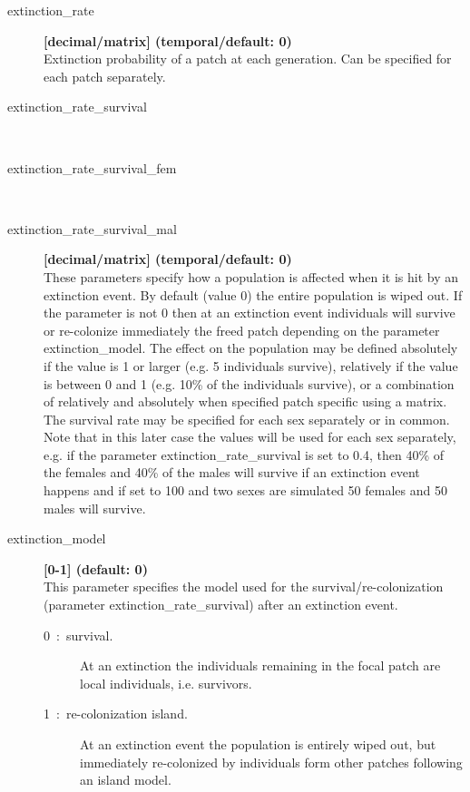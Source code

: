\documentclass[letterpaper,12pt,oneside]{book}
\begin{document}
\begin{description}
\item[extinction\_rate] \textbf{[decimal/matrix] (temporal/default: 0)}\\
Extinction probability of a patch at each generation. Can be specified for each patch separately.

\item[extinction\_rate\_survival]\hspace*{\fill}\\
\vspace{-9mm}
\item[extinction\_rate\_survival\_fem]\hspace*{\fill}\\
\vspace{-9mm}
\item[extinction\_rate\_survival\_mal] \textbf{[decimal/matrix] (temporal/default: 0)}\\
These parameters specify how a population is affected when it is hit by an extinction event. By default (value 0) the entire population is wiped out. If the parameter is not 0 then at an extinction event individuals will survive or re-colonize immediately the freed patch depending on the parameter \textsf{extinction\_model}. The effect on the population may be defined absolutely if the value is 1 or larger (e.g. 5 individuals survive), relatively if the value is between 0 and 1 (e.g. 10\% of the individuals survive), or a combination of relatively and absolutely when specified patch specific  using a matrix. The survival rate may be specified for each sex separately or in common. Note that in this later case the values will be used for each sex separately, e.g. if the parameter \textsf{extinction\_rate\_survival} is set to 0.4, then 40\% of the females and 40\% of the males will survive if an extinction event happens and if set to 100 and two sexes are simulated 50 females and 50 males will survive.

\item[extinction\_model] \textbf{[0-1] (default: 0)}  \\
This parameter specifies the model used for the survival/re-colonization (parameter \textsf{extinction\_rate\_survival}) after an extinction event.
\begin{description}
\item[0~:~survival.] At an extinction the individuals remaining in the focal patch are local individuals, i.e. survivors.
\item[1~:~re-colonization island.] At an extinction event the population is entirely wiped out, but immediately re-colonized by individuals form other patches following an island model.
\end{description}


\end{description}
\end{document}

